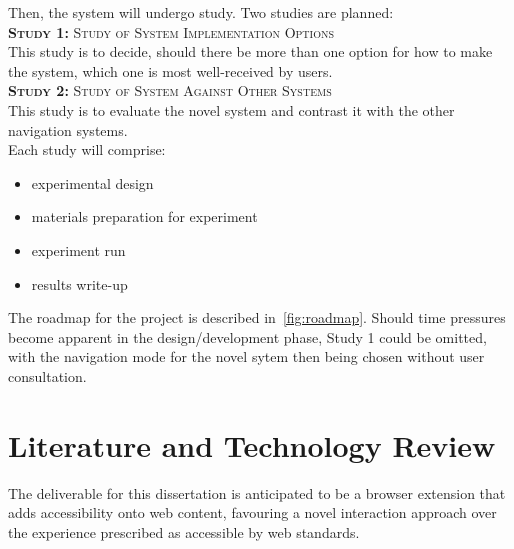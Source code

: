 \documentclass[a4paper, 11pt]{article}
\begin{document}
Then, the system will undergo study. Two studies are planned:~\\
\textsc{\textbf{Study 1:} Study of System Implementation Options}~\\
This study is to decide, should there be more than one option for how to make the system, which one is most well-received by users.~\\
\textsc{\textbf{Study 2:} Study of System Against Other Systems}~\\
This study is to evaluate the novel system and contrast it with the other navigation systems.~\\

Each study will comprise:

\begin{itemize}
\item experimental design
\item materials preparation for experiment
\item experiment run
\item results write-up
\end{itemize}

The roadmap for the project is described in~\cref{fig:roadmap}.
Should time pressures become apparent in the design/development phase, Study 1 could be omitted, with the navigation mode for the novel sytem then being chosen without user consultation.

\section{Literature and Technology Review}
The deliverable for this dissertation is anticipated to be a browser extension that adds accessibility onto web content, favouring a novel interaction approach over the experience prescribed as accessible by web standards.
\end{document}
